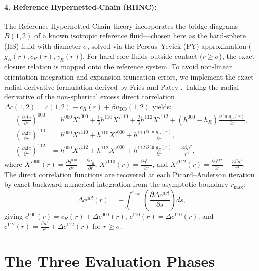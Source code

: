 \documentclass[11pt,a4paper]{article}
\begin{document}
\paragraph{4. Reference Hypernetted-Chain (RHNC):}
The Reference Hypernetted-Chain theory \cite{lado1982hypernetted, fries1985solution} incorporates the bridge diagrams $B(1, 2)$ of a known isotropic reference fluid---chosen here as the hard-sphere (HS) fluid with diameter $\sigma$, solved via the Percus--Yevick (PY) approximation ($g_R(r), c_R(r), \gamma_R(r)$). For hard-core fluids outside contact ($r \ge \sigma$), the exact closure relation is mapped onto the reference system. To avoid non-linear orientation integration and expansion truncation errors, we implement the exact radial derivative formulation derived by Fries and Patey \cite{fries1985solution}. Taking the radial derivative of the non-spherical excess direct correlation $\Delta c(1, 2) = c(1, 2) - c_R(r) + \beta u_{\text{DD}}(1, 2)$ yields:
\begin{align}
    \left( \frac{\partial \Delta c}{\partial r} \right)^{000} &= h^{000} X'^{000} + \frac{1}{3} h^{110} X'^{110} + \frac{2}{3} h^{112} X'^{112} + (h^{000} - h_R) \frac{\partial \ln g_R(r)}{\partial r}, \\
    \left( \frac{\partial \Delta c}{\partial r} \right)^{110} &= h^{000} X'^{110} + h^{110} X'^{000} + h^{110} \frac{\partial \ln g_R(r)}{\partial r}, \\
    \left( \frac{\partial \Delta c}{\partial r} \right)^{112} &= h^{000} X'^{112} + h^{112} X'^{000} + h^{112} \frac{\partial \ln g_R(r)}{\partial r} - \frac{3\beta\mu^2}{r^4},
\end{align}
where $X'^{000}(r) = \frac{\partial \eta^{000}}{\partial r} - \frac{\partial \eta_R}{\partial r}$, $X'^{110}(r) = \frac{\partial \eta^{110}}{\partial r}$, and $X'^{112}(r) = \frac{\partial \eta^{112}}{\partial r} - \frac{3\beta\mu^2}{r^4}$. The direct correlation functions are recovered at each Picard--Anderson iteration by exact backward numerical integration from the asymptotic boundary $r_{\max}$:
\begin{equation}
    \Delta c^{\mu\nu l}(r) = -\int_r^{r_{\max}} \left( \frac{\partial \Delta c^{\mu\nu l}}{\partial s} \right) ds,
\end{equation}
giving $c^{000}(r) = c_R(r) + \Delta c^{000}(r)$, $c^{110}(r) = \Delta c^{110}(r)$, and $c^{112}(r) = \frac{\beta\mu^2}{r^3} + \Delta c^{112}(r)$ for $r \ge \sigma$.

\section{The Three Evaluation Phases}
\end{document}
